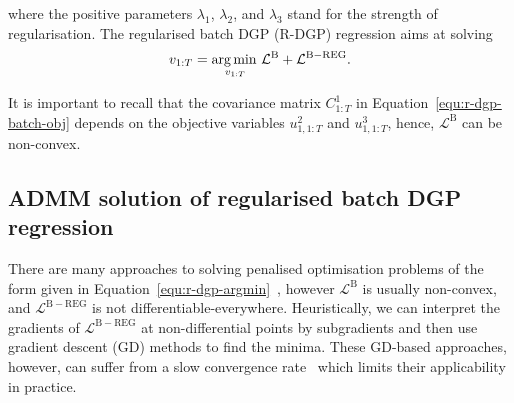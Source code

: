%
where the positive parameters $\lambda_1$, $\lambda_2$, and $\lambda_3$ stand for the strength of regularisation. The regularised batch DGP (R-DGP) regression aims at solving
%
\begin{equation}
	v_{1:T} = \operatorname*{arg\,min\,}_{v_{1:T}} \mathcal{L}^{\mathrm{B}} + \mathcal{L}^{\mathrm{B-REG}}.
	\label{equ:r-dgp-argmin}
\end{equation}
%
\begin{remark}
	It is important to recall that the covariance matrix $C^1_{1:T}$ in Equation~\eqref{equ:r-dgp-batch-obj} depends on the objective variables $u^2_{1, 1:T}$ and $u^3_{1, 1:T}$, hence, $\mathcal{L}^\mathrm{B}$ can be non-convex. 
\end{remark}

\subsection*{ADMM solution of regularised batch DGP regression}
There are many approaches to solving penalised optimisation problems of the form given in Equation~\eqref{equ:r-dgp-argmin}~\citep{Ruszczynski2006, Wright2006}, however $\mathcal{L}^{\mathrm{B}}$ is usually non-convex, and $\mathcal{L}^\mathrm{B-REG}$ is not differentiable-everywhere. Heuristically, we can interpret the gradients of $\mathcal{L}^\mathrm{B-REG}$ at non-differential points by subgradients and then use gradient descent (GD) methods to find the minima. These GD-based approaches, however, can suffer from a slow convergence rate~\citep{Hastie2015} which limits their applicability in practice.

